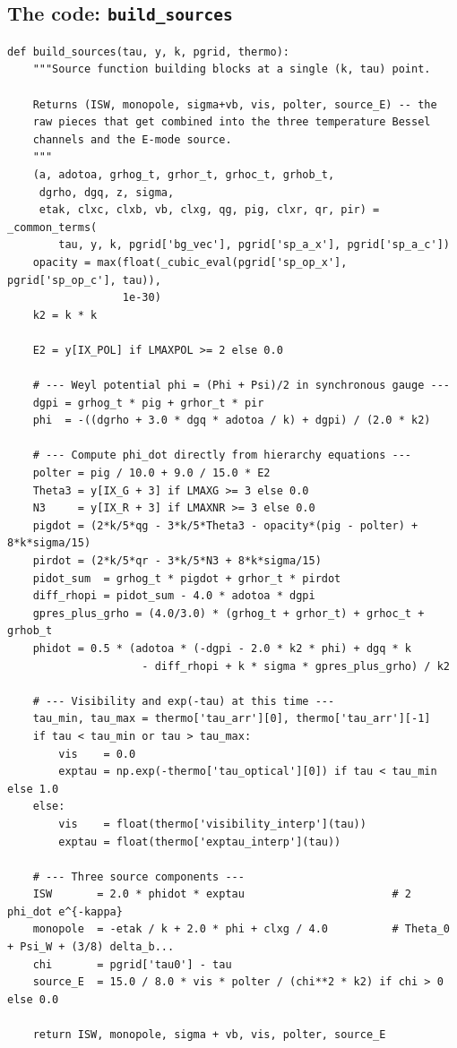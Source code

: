 \subsection{The code: \texttt{build\_sources}}

\begin{codebox}
\begin{lstlisting}[style=python]
def build_sources(tau, y, k, pgrid, thermo):
    """Source function building blocks at a single (k, tau) point.

    Returns (ISW, monopole, sigma+vb, vis, polter, source_E) -- the
    raw pieces that get combined into the three temperature Bessel
    channels and the E-mode source.
    """
    (a, adotoa, grhog_t, grhor_t, grhoc_t, grhob_t,
     dgrho, dgq, z, sigma,
     etak, clxc, clxb, vb, clxg, qg, pig, clxr, qr, pir) = _common_terms(
        tau, y, k, pgrid['bg_vec'], pgrid['sp_a_x'], pgrid['sp_a_c'])
    opacity = max(float(_cubic_eval(pgrid['sp_op_x'], pgrid['sp_op_c'], tau)),
                  1e-30)
    k2 = k * k

    E2 = y[IX_POL] if LMAXPOL >= 2 else 0.0

    # --- Weyl potential phi = (Phi + Psi)/2 in synchronous gauge ---
    dgpi = grhog_t * pig + grhor_t * pir
    phi  = -((dgrho + 3.0 * dgq * adotoa / k) + dgpi) / (2.0 * k2)

    # --- Compute phi_dot directly from hierarchy equations ---
    polter = pig / 10.0 + 9.0 / 15.0 * E2
    Theta3 = y[IX_G + 3] if LMAXG >= 3 else 0.0
    N3     = y[IX_R + 3] if LMAXNR >= 3 else 0.0
    pigdot = (2*k/5*qg - 3*k/5*Theta3 - opacity*(pig - polter) + 8*k*sigma/15)
    pirdot = (2*k/5*qr - 3*k/5*N3 + 8*k*sigma/15)
    pidot_sum  = grhog_t * pigdot + grhor_t * pirdot
    diff_rhopi = pidot_sum - 4.0 * adotoa * dgpi
    gpres_plus_grho = (4.0/3.0) * (grhog_t + grhor_t) + grhoc_t + grhob_t
    phidot = 0.5 * (adotoa * (-dgpi - 2.0 * k2 * phi) + dgq * k
                     - diff_rhopi + k * sigma * gpres_plus_grho) / k2

    # --- Visibility and exp(-tau) at this time ---
    tau_min, tau_max = thermo['tau_arr'][0], thermo['tau_arr'][-1]
    if tau < tau_min or tau > tau_max:
        vis    = 0.0
        exptau = np.exp(-thermo['tau_optical'][0]) if tau < tau_min else 1.0
    else:
        vis    = float(thermo['visibility_interp'](tau))
        exptau = float(thermo['exptau_interp'](tau))

    # --- Three source components ---
    ISW       = 2.0 * phidot * exptau                       # 2 phi_dot e^{-kappa}
    monopole  = -etak / k + 2.0 * phi + clxg / 4.0          # Theta_0 + Psi_W + (3/8) delta_b...
    chi       = pgrid['tau0'] - tau
    source_E  = 15.0 / 8.0 * vis * polter / (chi**2 * k2) if chi > 0 else 0.0

    return ISW, monopole, sigma + vb, vis, polter, source_E
\end{lstlisting}
\end{codebox}

